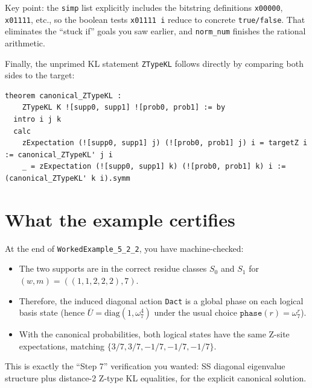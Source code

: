 \documentclass[11pt]{article}
\begin{document}
Key point: the \texttt{simp} list explicitly includes the bitstring definitions \texttt{x00000}, \texttt{x01111}, etc., so the boolean tests \texttt{x01111 i} reduce to concrete \texttt{true/false}. That eliminates the ``stuck if'' goals you saw earlier, and \texttt{norm\_num} finishes the rational arithmetic.

Finally, the unprimed KL statement \texttt{ZTypeKL} follows directly by comparing both sides to the target:

\begin{lstlisting}
theorem canonical_ZTypeKL :
    ZTypeKL K ![supp0, supp1] ![prob0, prob1] := by
  intro i j k
  calc
    zExpectation (![supp0, supp1] j) (![prob0, prob1] j) i = targetZ i := canonical_ZTypeKL' j i
    _ = zExpectation (![supp0, supp1] k) (![prob0, prob1] k) i := (canonical_ZTypeKL' k i).symm
\end{lstlisting}

\section*{What the example certifies}

At the end of \texttt{WorkedExample\_5\_2\_2}, you have machine-checked:

\begin{itemize}
\item The two supports are in the correct residue classes \(S_0\) and \(S_1\) for \((w,m)=( (1,1,2,2,2),7)\).
\item Therefore, the induced diagonal action \texttt{Dact} is a global phase on each logical basis state (hence \(\overline U=\mathrm{diag}(1,\omega_7^4)\) under the usual choice \(\texttt{phase}(r)=\omega_7^r\)).
\item With the canonical probabilities, both logical states have the same Z-site expectations, matching \(\{3/7,3/7,-1/7,-1/7,-1/7\}\).
\end{itemize}

This is exactly the ``Step 7'' verification you wanted: SS diagonal eigenvalue structure plus distance-2 Z-type KL equalities, for the explicit canonical solution.
\end{document}
